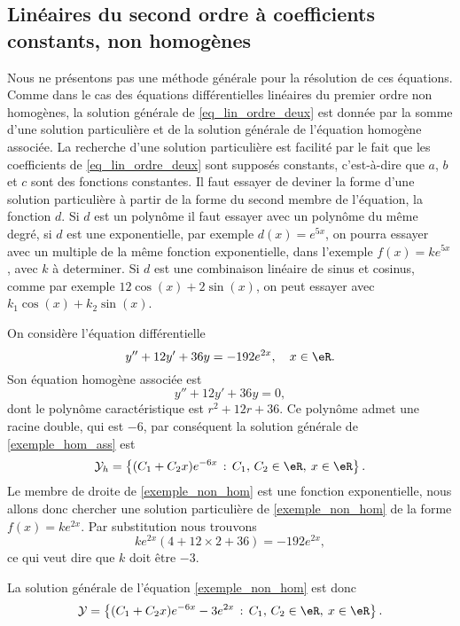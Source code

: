 \subsection{Linéaires du second ordre à coefficients constants, non homogènes}

Nous ne présentons pas une méthode générale pour la résolution de ces équations. Comme dans le cas des équations différentielles linéaires du premier ordre non homogènes, la solution générale de \eqref{eq_lin_ordre_deux} est donnée par la somme d'une solution particulière et de la solution générale de l'équation homogène associée. La recherche d'une solution particulière est facilité par le fait que les coefficients de \eqref{eq_lin_ordre_deux} sont supposés constants, c'est-à-dire que $a$, $b$ et $c$ sont des fonctions constantes. Il faut essayer de deviner la forme d'une solution particulière à partir de la forme du second membre de l'équation, la fonction $d$. Si $d$ est un polynôme il faut essayer avec un polynôme du même degré, si $d$ est une exponentielle, par exemple $d(x) = e^{5x}$, on pourra essayer avec un multiple de la m\^eme fonction exponentielle, dans l'exemple $f(x) = k e^{5x}$, avec $k$ à determiner. Si $d$ est une combinaison linéaire de sinus et cosinus, comme par exemple $12\cos(x) + 2\sin(x)$, on peut essayer avec $k_1\cos(x) + k_2\sin(x)$.

\begin{example}
  On considère l'équation différentielle
  \begin{equation}\label{exemple_non_hom}
    y'' + 12y' + 36 y = -192 e^{2x}, \quad x\in\eR.
  \end{equation}
  Son équation homogène associée est
\begin{equation}\label{exemple_hom_ass}
    y'' + 12y' + 36 y = 0,
  \end{equation}
dont le polynôme caractéristique est $r^2 + 12 r + 36$. Ce polynôme admet une racine double, qui est $-6$, par conséquent la solution générale de \eqref{exemple_hom_ass} est
\begin{equation*}
      \mathcal{Y}_h  = \left\{(C_1  +C_2x) e^{-6 x} \,:\, C_1,\, C_2 \in \eR, \: x\in \eR\right\}.
    \end{equation*}
Le membre de droite de \eqref{exemple_non_hom} est une fonction exponentielle, nous allons donc chercher une solution particulière de \eqref{exemple_non_hom} de la forme $f(x) = ke^{2x}$. Par substitution nous trouvons
\[
  ke^{2x}(4 + 12 \times 2 +36) = -192 e^{2x},
\]
ce qui veut dire que $k$ doit \^etre $-3$.

La solution générale de l'équation \eqref{exemple_non_hom} est donc
\begin{equation*}
      \mathcal{Y}  = \left\{(C_1  +C_2x) e^{-6 x} -3e^{2x} \,:\, C_1,\, C_2 \in \eR, \: x\in \eR\right\}.
    \end{equation*}
\end{example}

